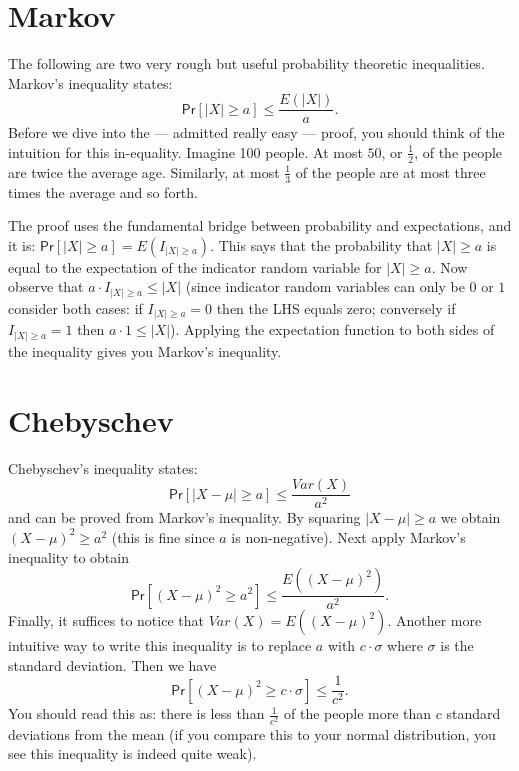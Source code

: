 \documentclass[twoside]{article}
\newcommand\Prob{\mathsf{Pr}}
\begin{document}
\section{Markov}
The following are two very rough but useful probability theoretic inequalities. Markov's inequality states: 
\[\Prob\left[|X| \geq a\right] \leq \frac{E(|X|)}{a}.\]
Before we dive into the --- admitted really easy --- proof, you should think of the intuition for this in-equality. Imagine 100 people. At most $50$, or $\frac{1}{2}$, of the people are twice the average age. Similarly, at most $\frac{1}{3}$ of the people are at most three times the average and so forth.

The proof uses the fundamental bridge between probability and expectations, and it is: $\Prob[|X| \geq a] = E(I_{|X|\geq a})$. This says that the probability that $|X| \geq a$ is equal to the expectation of the indicator random variable for $|X| \geq a$. Now observe that $a \cdot I_{|X| \geq a} \leq |X|$ (since indicator random variables can only be $0$ or $1$ consider both cases: if $I_{|X| \geq a} = 0$ then the LHS equals zero; conversely if $I_{|X|\geq a} = 1$ then $a \cdot 1 \leq |X|$). Applying the expectation function to both sides of the inequality gives you Markov's inequality.

\section{Chebyschev}
Chebyschev's inequality states:
\[\Prob[|X-\mu| \geq a] \leq \frac{Var(X)}{a^2}\]
and can be proved from Markov's inequality. By squaring $|X-\mu| \geq a$ we obtain $(X-\mu)^2 \geq a^2$ (this is fine since $a$ is non-negative). Next apply Markov's inequality to obtain
\[\Prob\left[(X-\mu)^2 \geq a^2\right] \leq \frac{E\left((X-\mu)^2\right)}{a^2}.\]
Finally, it suffices to notice that $Var(X) = E\left((X-\mu)^2\right)$. Another more intuitive way to write this inequality is to replace $a$ with $c \cdot \sigma$ where $\sigma$ is the standard deviation. Then we have
\[\Prob\left[(X-\mu)^2 \geq c\cdot \sigma\right] \leq \frac{1}{c^2}.\]
You should read this as: there is less than $\frac{1}{c^2}$ of the people more than $c$ standard deviations from the mean (if you compare this to your normal distribution, you see this inequality is indeed quite weak).
\end{document}
